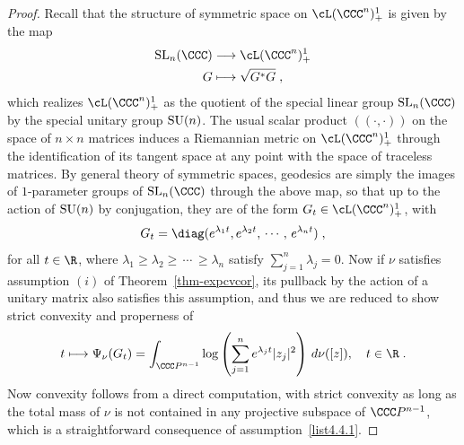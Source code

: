 \begin{proof}
Recall that the structure of symmetric space on $\cL(\CCC^n)_+^1$ is given by the map
\begin{equation}
\begin{split}
\textup{SL}_n(\CCC)&\longrightarrow\cL(\CCC^n)_+^1\\
G&\longmapsto \sqrt{G^*G}\;,
\end{split}
\end{equation}
which realizes $\cL(\CCC^n)_+^1$ as the quotient of the special linear group $\textup{SL}_n(\CCC)$ by the special unitary group $\textup{SU}(n)$. The usual scalar product $((\cdot,\cdot))$ on the space of $n \times n$ matrices induces a Riemannian metric on $\cL(\CCC^n)_+^1$ through the identification of its tangent space at any point with the space of traceless matrices. By general theory of symmetric spaces, geodesics are simply the images of $1$-parameter groups of $\textup{SL}_n(\CCC)$ through the above map, so that up to the action of $\textup{SU}(n)$ by conjugation, they are of the form $G_t\in\cL(\CCC^n)_+^1$, with
\begin{equation}
G_t=\diag(e^{\lambda_1 t},e^{\lambda_2 t},\,\cdots,\,e^{\lambda_n t})\;,
\end{equation}
for all $t\in\R$, where $\lambda_1\geq\lambda_2\geq\,\cdots\,\geq\lambda_n$ satisfy $\sum_{j=1}^n\lambda_j=0$. Now if $\nu$ satisfies assumption $(i)$ of Theorem~\ref{thm-expcvcor}, its pullback by the action of a unitary matrix also satisfies this assumption, and thus we are reduced to show strict convexity and properness of
\begin{equation}
t\longmapsto\Psi_\nu(G_t)=\int_{\CCC P^{n-1}}\log\left(\sum_{j=1}^ne^{\lambda_j t} |z_j|^2\right)\,d\nu([z]),\quad t\in\R\;.
\end{equation}
Now convexity follows from a direct computation, with strict convexity as long as the total mass of $\nu$ is not contained in any projective subspace of $\CCC P^{n-1}$, which is a straightforward consequence of assumption~\eqref{list4.4.1}.


\end{proof}
